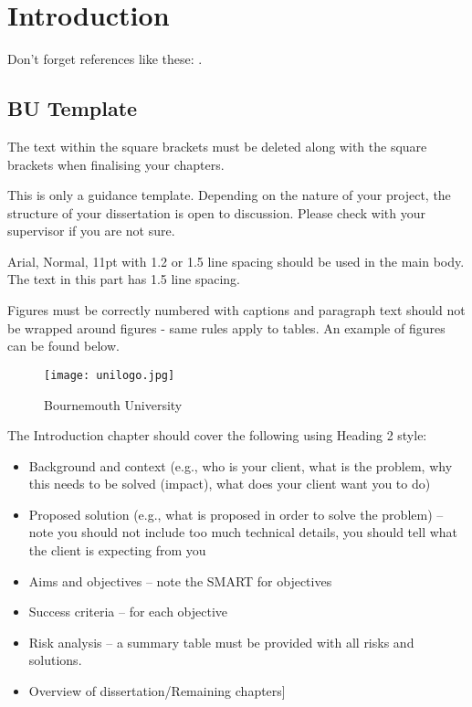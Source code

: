 
\chapter{Introduction}
\label{chap:intro}
Don't forget references like these: \citep{UbuntuSecurity}.

\section{BU Template}
The text within the square brackets must be deleted along with the square brackets when finalising your chapters. 

This is only a guidance template. Depending on the nature of your project, the structure of your dissertation is open to discussion. Please check with your supervisor if you are not sure. 

Arial, Normal, 11pt with 1.2 or 1.5 line spacing should be used in the main body. The text in this part has 1.5 line spacing. 

Figures must be correctly numbered with captions and paragraph text should not be wrapped around figures - same rules apply to tables. An example of figures can be found below.
\begin{figure}[t]
	\centering
	\texttt{[image: unilogo.jpg]}
	\caption{Bournemouth University}
	\label{fig:BULogo1}
\end{figure}
The Introduction chapter should cover the following using Heading 2 style:
\begin{itemize}
	\item Background and context (e.g., who is your client, what is the problem, why this needs to be solved (impact), what does your client want you to do)
	\item Proposed solution (e.g., what is proposed in order to solve the problem) – note you should not include too much technical details, you should tell what the client is expecting from you
	\item Aims and objectives – note the SMART for objectives
 	\item Success criteria – for each objective
	\item Risk analysis – a summary table must be provided with all risks and solutions.
	\item Overview of dissertation/Remaining chapters]
\end{itemize}


